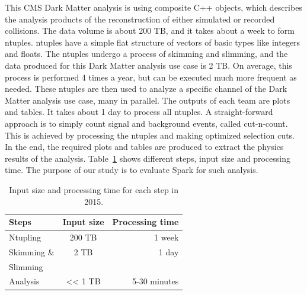 \documentclass[11pt, twocolumn]{article}
\begin{document}
This CMS Dark Matter analysis is using composite C++ objects, 
which describes the analysis products of the reconstruction of either 
simulated or recorded collisions. 
The data volume is about 200 TB, and it takes about a week to form ntuples. 
 ntuples have a simple flat structure of vectors of basic types like integers and floats. 
The ntuples undergo a process of skimming and slimming, and the data produced for this Dark Matter 
analysis use case is 2 TB. On average, this process is performed 
4 times a year, but can be executed much more frequent as needed. 
These ntuples are then used to analyze a specific channel of 
the Dark Matter analysis use case, many in parallel. 
The outputs of each team are plots and tables. 
It takes about 1 day to process all ntuples. 
A straight-forward approach is to simply count signal and background events, 
called cut-n-count. This is achieved by processing the ntuples 
and making optimized selection cuts. In the end, the required plots
 and tables are produced to extract the physics results of the analysis.
 Table~\ref{tab:1} shows different steps, input size and processing time. 
 The purpose of our study is to evaluate Spark for such analysis. 

\begin{table}[h]
\begin{tabular}{ l | c | r }
\hline
  Steps & Input size & Processing time \\
  \hline
  Ntupling & 200 TB & ~ 1 week \\
  \hline
  Skimming \&  &2 TB  & ~ 1 day\\
  Slimming & & \\
  \hline
  Analysis &  << 1 TB & 5-30 minutes\\
  \hline
\end{tabular}
\caption{Input size and processing time for each step in 2015.}
  \label{tab:1}
  \end{table}

\end{document}
